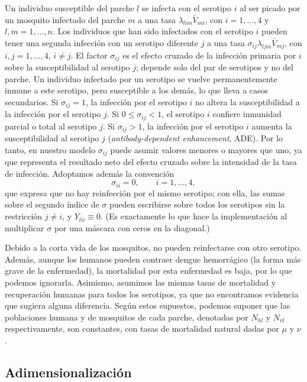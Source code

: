 \documentclass{article}
\numberwithin{equation}{section}
\begin{document}
Un individuo susceptible del parche $l$ se infecta con el serotipo $i$ al ser picado por un mosquito infectado del parche $m$ a una tasa $\lambda_{lim}\bar V_{mi}$, con $i=1,\dots,4$ y $l,m=1,\dots,n$. Los individuos que han sido infectados con el serotipo $i$ pueden tener una segunda infección con un serotipo diferente $j$ a una tasa $\sigma_{ij}\lambda_{ljm}\bar V_{mj}$, con $i,j=1,\dots,4$, $i\neq j$. El factor $\sigma_{ij}$ es el efecto cruzado de la infección primaria por $i$ sobre la susceptibilidad al serotipo $j$; depende solo del par de serotipos y no del parche. Un individuo infectado por un serotipo se vuelve permanentemente inmune a este serotipo, pero susceptible a los demás, lo que lleva a casos secundarios. Si $\sigma_{ij}=1$, la infección por el serotipo $i$ no altera la susceptibilidad a la infección por el serotipo $j$. Si $0\leq\sigma_{ij}<1$, el serotipo $i$ confiere inmunidad parcial o total al serotipo $j$. Si $\sigma_{ij}>1$, la infección por el serotipo $i$ aumenta la susceptibilidad al serotipo $j$ (\emph{antibody-dependent enhancement}, ADE). Por lo tanto, en nuestro modelo $\sigma_{ij}$ puede asumir valores menores o mayores que uno, ya que representa el resultado neto del efecto cruzado sobre la intensidad de la tasa de infección. Adoptamos además la convención
\begin{equation}\label{eq:sigma-diag}
\sigma_{ii}=0,\qquad i=1,\dots,4,
\end{equation}
que expresa que no hay reinfección por el mismo serotipo; con ella, las sumas sobre el segundo índice de $\sigma$ pueden escribirse sobre todos los serotipos sin la restricción $j\neq i$, y $Y_{lii}\equiv 0$. (Es exactamente lo que hace la implementación al multiplicar $\sigma$ por una máscara con ceros en la diagonal.)

Debido a la corta vida de los mosquitos, no pueden reinfectarse con otro serotipo. Además, aunque los humanos pueden contraer dengue hemorrágico (la forma más grave de la enfermedad), la mortalidad por esta enfermedad es baja, por lo que podemos ignorarla. Asimismo, asumimos las mismas tasas de mortalidad y recuperación humanas para todos los serotipos, ya que no encontramos evidencia que sugiera alguna diferencia. Según estos supuestos, podemos suponer que las poblaciones humana y de mosquitos de cada parche, denotadas por $N_{hl}$ y $N_{vl}$ respectivamente, son constantes, con tasas de mortalidad natural dadas por $\mu$ y $\nu$.

\subsection{Adimensionalización}\label{sec:adimensional}
\end{document}
